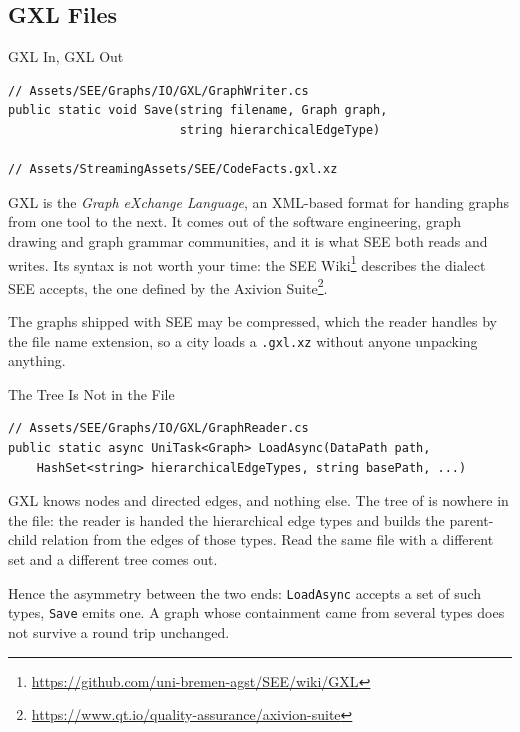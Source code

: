 \subsection{GXL Files}

\begin{frame}[fragile]{GXL In, GXL Out}
  \begin{lstlisting}[basicstyle=\scriptsize\ttfamily]
// Assets/SEE/Graphs/IO/GXL/GraphWriter.cs
public static void Save(string filename, Graph graph,
                        string hierarchicalEdgeType)

// Assets/StreamingAssets/SEE/CodeFacts.gxl.xz
  \end{lstlisting}
  \vspace{1ex}

  GXL is the \emph{Graph eXchange Language}, an XML-based format for handing
  graphs from one tool to the next. It comes out of the software engineering,
  graph drawing and graph grammar communities, and it is what SEE both reads
  and writes. Its syntax is not worth your time: the SEE Wiki\footnote{\url{https://github.com/uni-bremen-agst/SEE/wiki/GXL}}
  describes the dialect SEE accepts, the one defined by the Axivion
  Suite\footnote{\url{https://www.qt.io/quality-assurance/axivion-suite}}.
  \vspace{1ex}

  The graphs shipped with SEE may be compressed, which the reader handles by the
  file name extension, so a city loads a \texttt{.gxl.xz} without anyone
  unpacking anything.
\end{frame}

\begin{frame}[fragile]{The Tree Is Not in the File}
  \begin{lstlisting}[basicstyle=\scriptsize\ttfamily]
// Assets/SEE/Graphs/IO/GXL/GraphReader.cs
public static async UniTask<Graph> LoadAsync(DataPath path,
    HashSet<string> hierarchicalEdgeTypes, string basePath, ...)
  \end{lstlisting}
  \vspace{1ex}

  GXL knows nodes and directed edges, and nothing else. The tree of
   is nowhere in the file: the reader is handed
  the hierarchical edge types and builds the parent-child relation from the
  edges of those types. Read the same file with a different set and a different
  tree comes out.
  \vspace{1ex}

  Hence the asymmetry between the two ends: \texttt{LoadAsync} accepts a set of
  such types, \texttt{Save} emits one. A graph whose containment came from
  several types does not survive a round trip unchanged.
\end{frame}

